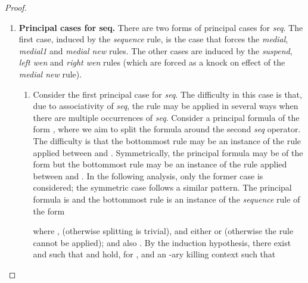 \begin{proof}
\begin{enumerate}[label=\textbf{\Alph*},ref=\Alph*,leftmargin=*]
\begin{enumerate}[label*=\textbf{.\arabic*}]
\begin{comment}
Now observe that the following proof can always be constructed for every  such that .

By using the proof above, a proof can be constructed for each  in the following two cases.

In the first case where , a proof can be constructed such that

Furthermore, by Lemma~\ref{lemma:bound}, . Hence 
Hence .

In the second case,  and, since , by Lemma~\ref{lemma:nfv} we have .
Hence the following proof can be constructed, using the above proof:
.
Furthermore, by Lemma~\ref{lemma:bound}, .
Hence .
\end{comment}

\end{enumerate}



\item \textbf{Principal cases for seq.} There are two forms of principal cases for \textit{seq}.
The first case, induced by the \textit{sequence} rule, is the case that forces the \textit{medial}, \textit{medial1} and \textit{medial new} rules.
The other cases are induced by the \textit{suspend}, \textit{left wen} and \textit{right wen} rules (which are forced as a knock on effect of the \textit{medial new} rule).

\begin{enumerate}[label*=\textbf{.\arabic*}]
\item Consider the first principal case for \textit{seq}.
The difficulty in this case is that, due to associativity of \textit{seq}, the \rseq rule may be applied in several ways when there are multiple occurrences of \textit{seq}.
Consider a principal formula of the form , where we aim to split the formula around the second \textit{seq} operator. The difficulty is that the bottommost rule may be an instance of the \rseq rule applied between  and . Symmetrically, the principal formula may be of the form  but the bottommost rule may be an instance of the \rseq rule applied between  and .
In the following analysis, only the former case is considered; the symmetric case follows a similar pattern.
The principal formula is  and the bottommost rule is an instance of the \textit{sequence} rule of the form
 
where ,  (otherwise splitting is trivial), and either  or  (otherwise the \rseq rule cannot be applied);
and also .
By the induction hypothesis, there exist  and  such that  and  hold, for , and an -ary killing context  such that 


\end{enumerate}
\end{enumerate}
\end{proof}
